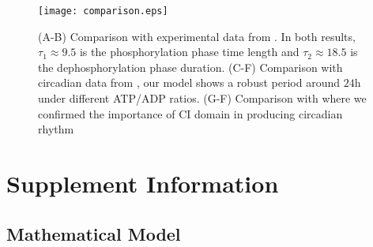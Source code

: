 \documentclass[a4paper,10pt]{article}
\numberwithin{equation}{section}
\begin{document}
\begin{figure}
\centering
\texttt{[image: comparison.eps]}
\caption{\selectfont (A-B) Comparison with experimental data from \citet{rust809}. In both results, $\tau_1\approx 9.5$ is the phosphorylation phase time length and $\tau_2\approx18.5$ is the dephosphorylation phase duration. (C-F) Comparison with circadian data from \citet{phong2012},  our model shows a robust period around $24$h under different ATP/ADP ratios. (G-F) Comparison with \citet{phong2012} where we confirmed the importance of CI domain in producing circadian rhythm }\label{fig:comparison}
\end{figure}



\vfill

\section{Supplement Information}
\subsection{Mathematical Model}
\end{document}
